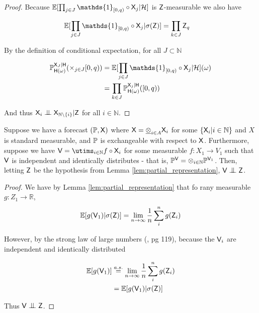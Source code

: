 \begin{proof}
Because $\mathbb{E}[\prod_{j\in J} \mathds{1}_{[0,q)}\circ \RV{X}_j|\sigalg{H}]$ is $\mathsf{Z}$-measurable we also have

\begin{align}
    \mathbb{E}[\prod_{j\in J} \mathds{1}_{[0,q)}\circ \RV{X}_j|\sigma(\RV{Z})] &= \prod_{k\in J} \RV{Z}_q
\end{align}

By the definition of conditional expectation, for all $J\subset \mathbb{N}$

\begin{align}
    \prob{P}_{\RV{H}(\omega)}^{\RV{X}_J|\RV{H}}(\times_{j\in J}[0,q)) &= \mathbb{E}[\prod_{j\in J} \mathds{1}_{[0,q)}\circ \RV{X}_j|\sigalg{H}](\omega)\\
                                                                      &= \prod_{k\in J} \prob{P}_{\RV{H}(\omega)}^{\RV{X}_j|\RV{H}}([0,q))
\end{align}

And thus $\RV{X}_i\CI\RV{X}_{\mathbb{N}\setminus\{i\}}|\RV{Z}$ for all $i\in\mathbb{N}$.
\end{proof}

\begin{lemma}\label{lem:iid_rvs}
Suppose we have a forecast $(\mathbb{P},\mathsf{X})$ where $\mathsf{X}=\underline{\otimes}_{i\in A} \mathsf{X}_i$ for some $\{\mathsf{X}_i|i\in \mathbb{N}\}$ and $X$ is standard measurable, and $\mathbb{P}$ is exchangeable with respect to $\mathsf{X}$. Furthermore, suppose we have $\RV{V}=\utims_{i\in\mathbb{N}} f\circ \RV{X}_i$ for some measurable $f:X_1\to V_1$ such that $\mathsf{V}$ is independent and identically distributes - that is, $\mathbb{P}^{\mathsf{V}} = \otimes_{i\in\mathbb{N}} \mathbb{P}^{\mathsf{V}_1}$. Then, letting $\mathsf{Z}$ be the hypothesis from Lemma \ref{lem:partial_representation}, $\RV{V}\CI\RV{Z}$.
\end{lemma}

\begin{proof}

We have by Lemma \ref{lem:partial_representation} that fo rany measurable $g:Z_1\to \mathbb{R}$,
\begin{align}
    \mathbb{E}[g(\mathsf{V}_1)|\sigma(\mathsf{Z})] = \lim_{n\to\infty} \frac{1}{n}\sum_i^n g(\mathsf{Z}_i)
\end{align}

However, by the strong law of large numbers (\citet{cinlar_probability_2011}, pg 119), because the $\mathsf{V}_i$ are independent and identically distributed

\begin{align}
    \mathbb{E}[g(\mathsf{V}_1)] &\overset{a.s.}{=} \lim_{n\to\infty}\frac{1}{n}\sum_i^n g(\mathsf{Z}_i)\\
                            &= \mathbb{E}[g(\mathsf{V}_1)|\sigma(\mathsf{Z})]
\end{align}

Thus $\RV{V}\CI\RV{Z}$.

\end{proof}

